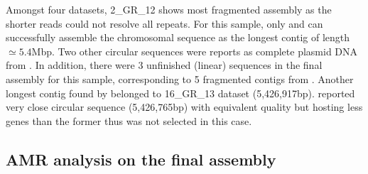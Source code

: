 Amongst four datasets, 2\_GR\_12 shows most fragmented assembly as the shorter reads could not resolve all repeats. For this sample, only \npscarf{} and \canu{} can successfully assemble the chromosomal sequence as the longest contig of length $\simeq 5.4$Mbp. Two other circular sequences were reports as complete plasmid DNA from \unicycler{}. In addition, there were 3 unfinished (linear) sequences in the final assembly for this sample, corresponding to 5 fragmented contigs from \unicycler{}. Another longest contig found by \npscarf{} belonged to 16\_GR\_13 dataset (5,426,917bp). \unicycler{} reported very close circular sequence (5,426,765bp) with equivalent quality but hosting less genes than the former thus was not selected in this case. %

\subsection{AMR analysis on the final assembly}

